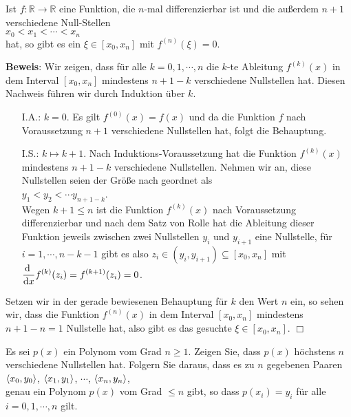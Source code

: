 \begin{Satz}
  Ist $f:\mathbb{R} \rightarrow \mathbb{R}$ eine Funktion, die $n$-mal differenzierbar
  ist und die au{\ss}erdem $n+1$ verschiedene Null-Stellen 
  \\[0.2cm]
  \hspace*{1.3cm}  $x_0 < x_1 < \cdots < x_n$
  \\[0.2cm]
  hat, so gibt es ein $\xi\in[x_0,x_n]$ mit $f^{(n)}(\xi) = 0$.
\end{Satz}
\textbf{Beweis}:  Wir zeigen, dass f\"ur alle $k=0,1,\cdots,n$ die $k$-te Ableitung
$f^{(k)}(x)$ in dem Interval $[x_0,x_n]$ mindestens $n+1-k$ verschiedene Nullstellen hat.
Diesen Nachweis f\"uhren wir durch Induktion \"uber $k$.
\begin{enumerate}
\item[I.A.:] $k=0$. Es gilt $f^{(0)}(x) = f(x)$ und da die Funktion $f$ nach Voraussetzung $n+1$
             verschiedene Nullstellen hat, folgt die Behauptung.
\item[I.S.:] $k\mapsto k+1$.  Nach Induktions-Voraussetzung hat die Funktion
             $f^{(k)}(x)$ mindestens $n + 1 -k$ verschiedene Nullstellen.
             Nehmen wir an, diese Nullstellen seien der Gr\"o{\ss}e nach geordnet als
             \\[0.2cm]
             \hspace*{1.3cm} $y_1 < y_2 < \cdots y_{n+1-k}$. \\[0.2cm]
             Wegen $k+1\leq n$ ist die Funktion $f^{(k)}(x)$ nach Voraussetzung
             differenzierbar und nach dem Satz von Rolle hat die Ableitung dieser Funktion
             jeweils zwischen zwei Nullstellen $y_i$ und $y_{i+1}$ eine Nullstelle, 
             f\"ur $i=1,\cdots,n-k-1$ gibt es also $z_i \in (y_i,y_{i+1}) \subseteq[x_0,x_n]$ mit 
             \\[0.2cm]
             \hspace*{1.3cm} $\displaystyle\frac{\textrm{d}\;}{\textrm{d}x} f^{(k)}(z_i) = f^{(k+1)}(z_i) = 0$.
\end{enumerate}
Setzen wir in der gerade bewiesenen Behauptung f\"ur $k$ den Wert $n$ ein, so sehen wir, dass die Funktion $f^{(n)}(x)$ in dem Interval
$[x_0,x_n]$ mindestens $n+1-n=1$ Nullstelle hat, also gibt es das gesuchte
$\xi\in[x_0,x_n]$.
\hspace*{\fill} $\Box$

\exercise
Es sei $p(x)$  ein Polynom vom Grad $n\geq 1$.  Zeigen Sie, dass
$p(x)$ h\"ochstens $n$ verschiedene Nullstellen hat.  Folgern Sie daraus, dass es zu $n$ gegebenen Paaren 
\\[0.2cm]
\hspace*{1.3cm}
$\pair(x_0,y_0)$, $\pair(x_1,y_1)$, $\cdots$, $\pair(x_n,y_n)$,
\\[0.2cm]
genau ein Polynom $p(x)$ vom Grad $\leq n$ gibt, so dass $p(x_i) = y_i$ f\"ur alle $i=0,1,\cdots,n$ gilt. \eox


